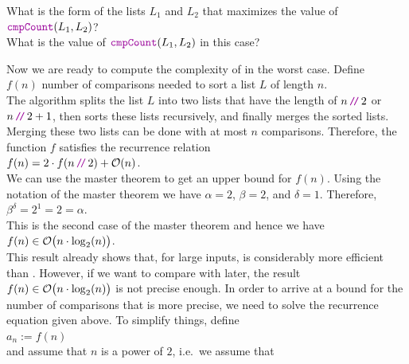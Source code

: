 \exercise
What is the form of the lists $L_1$ and $L_2$ that maximizes the value of 
\\[0.2cm]
\hspace*{1.3cm}
$\mytt{cmpCount}(L_1, L_2)$?
\\[0.2cm]
What is the value of $\mytt{cmpCount}(L_1, L_2)$ in this case? \eox
\vspace*{0.3cm}

\noindent
Now we are ready to compute the complexity of  in the worst case.  Define
\\[0.2cm]
\hspace*{1.3cm}
$f(n)$  \mytt{:=} number of comparisons needed to sort a list $L$ of length $n$.
\\[0.2cm]
The algorithm  
splits the list $L$ into two lists that have the length of $n\dv 2$ or $n\dv 2+1$, then sorts
these lists recursively, and finally merges the sorted lists.  Merging these two lists can be done with
at most $n$ comparisons.  Therefore, the function $f$ satisfies the recurrence relation
\\[0.2cm]
\hspace*{1.3cm}
$f(n) = 2 \cdot f(n \dv  2) + \Oh(n)$.
\\[0.2cm]
We can use the master theorem to get an upper bound for $f(n)$.  Using the notation of the master theorem we have
$\alpha = 2$, $\beta = 2$, and $\delta = 1$. Therefore,
\\[0.2cm]
\hspace*{1.3cm}
$\beta^\delta = 2^1 = 2 = \alpha$.
\\[0.2cm]
This is the second case of the master theorem and hence we have
\\[0.2cm]
\hspace*{1.3cm}
$f(n) \in \mathcal{O}\bigl(n \cdot \log_2(n) \bigr)$.
\\[0.2cm]
This result already shows that, for large inputs,  is considerably more efficient
than .  However, if we want to compare
 with  later, the result $f(n) \in \mathcal{O}\bigl(n \cdot \log_2(n) \bigr)$ is
not precise enough.  In order to arrive at a bound for the number of comparisons that is more precise,
we need to solve the recurrence equation given above.  To simplify things,  define
\\[0.2cm]
\hspace*{1.3cm}
$a_n := f(n)$ 
\\[0.2cm]
and assume that $n$ is a power of $2$, i.e.~we assume that
\\[0.2cm]
